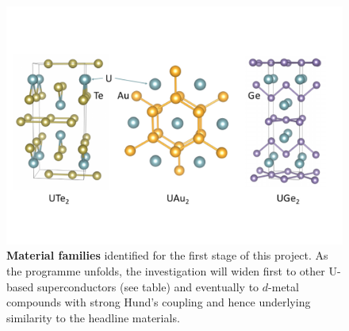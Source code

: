 \begin{figure}[t]
  \centerline{\includegraphics[width=\columnwidth]{Figures/Structures.pdf}}
  
     \caption{{\bf Material families} identified for the first stage of this project. As the programme unfolds, the investigation will widen first to other U-based superconductors (see table) and eventually to $d$-metal compounds with strong Hund's coupling and hence underlying similarity to the headline materials. }
     
      \label{fig:Materials}
  \end{figure}
  
 
  
